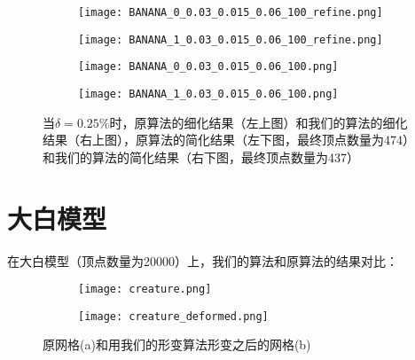 \begin{figure}[htbp]
  \centering
  \begin{subfigure}[b]{0.4\textwidth}
    \texttt{[image: BANANA\_0\_0.03\_0.015\_0.06\_100\_refine.png]}
  \end{subfigure}
  \begin{subfigure}[b]{0.4\textwidth}
    \texttt{[image: BANANA\_1\_0.03\_0.015\_0.06\_100\_refine.png]}
  \end{subfigure}
  \begin{subfigure}[b]{0.4\textwidth}
    \texttt{[image: BANANA\_0\_0.03\_0.015\_0.06\_100.png]}
  \end{subfigure}
  \begin{subfigure}[b]{0.4\textwidth}
    \texttt{[image: BANANA\_1\_0.03\_0.015\_0.06\_100.png]}
  \end{subfigure}
  \caption[当$\delta=0.25\%$时banana结果对比]{当$\delta=0.25\%$时，原算法的细化结果（左上图）和我们的算法的细化结果（右上图），原算法的简化结果（左下图，最终顶点数量为474）和我们的算法的简化结果（右下图，最终顶点数量为437）}
  \label{fig:banana-res2}
\end{figure}

\section{大白模型}
在大白模型（顶点数量为20000）上，我们的算法和原算法的结果对比：
\begin{figure}[htbp]
  \centering
  \begin{subfigure}[b]{0.4\textwidth}
    \texttt{[image: creature.png]}
    \end{subfigure}
    \begin{subfigure}[b]{0.4\textwidth}
      \texttt{[image: creature\_deformed.png]}
    \end{subfigure}
    \caption[大白的形变结果]{原网格(a)和用我们的形变算法形变之后的网格(b)}
    \label{fig:creature-deform}
\end{figure}

